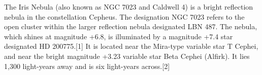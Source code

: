 The Iris Nebula (also known as NGC 7023 and Caldwell 4) is a bright reflection nebula in the constellation Cepheus. The designation NGC 7023 refers to the open cluster within the larger reflection nebula designated LBN 487. The nebula, which shines at magnitude +6.8, is illuminated by a magnitude +7.4 star designated HD 200775.[1] It is located near the Mira-type variable star T Cephei, and near the bright magnitude +3.23 variable star Beta Cephei (Alfirk). It lies 1,300 light-years away and is six light-years across.[2]



